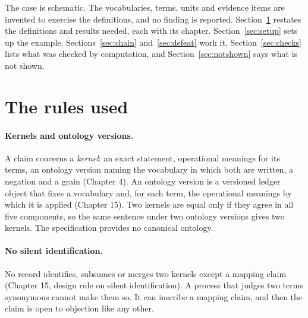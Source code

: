 \documentclass[11pt]{article}
\begin{document}
The case is schematic. The vocabularies, terms, units and evidence items are invented to exercise the definitions, and no finding is reported. Section~\ref{sec:rules} restates the definitions and results needed, each with its chapter. Section~\ref{sec:setup} sets up the example. Sections~\ref{sec:chain} and~\ref{sec:defeat} work it, Section~\ref{sec:checks} lists what was checked by computation, and Section~\ref{sec:notshown} says what is not shown.

\section{The rules used}\label{sec:rules}

\paragraph{Kernels and ontology versions.} A claim concerns a \emph{kernel}: an exact statement, operational meanings for its terms, an ontology version naming the vocabulary in which both are written, a negation and a grain (Chapter 4). An ontology version is a versioned ledger object that fixes a vocabulary and, for each term, the operational meanings by which it is applied (Chapter 15). Two kernels are equal only if they agree in all five components, so the same sentence under two ontology versions gives two kernels. The specification provides no canonical ontology.

\paragraph{No silent identification.} No record identifies, subsumes or merges two kernels except a mapping claim (Chapter 15, design rule on silent identification). A process that judges two terms synonymous cannot make them so. It can inscribe a mapping claim, and then the claim is open to objection like any other.
\end{document}
